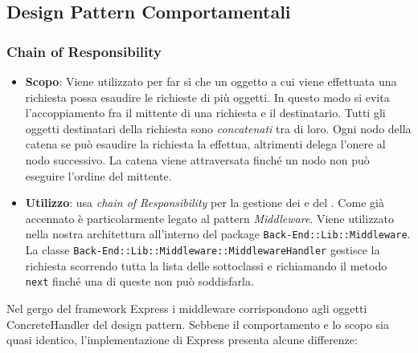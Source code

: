 \subsection{Design Pattern Comportamentali}

\subsubsection{Chain of Responsibility}
\label{chain-of-responsibility}

\begin{itemize}

	\item \textbf{Scopo}:
	Viene utilizzato per far sì che un oggetto a cui viene effettuata una richiesta possa esaudire le richieste di più oggetti. In questo modo si evita l'accoppiamento fra il mittente di una richiesta e il destinatario. Tutti gli oggetti destinatari della richiesta sono \textit{concatenati} tra di loro. Ogni nodo della catena se può esaudire la richiesta la effettua, altrimenti delega l'onere al nodo successivo. La catena viene attraversata finché un nodo non può eseguire l'ordine del mittente. 
	
	\item \textbf{Utilizzo}:
	 usa \textit{chain of Responsibility} per la gestione dei  e del . Come già accennato è particolarmente legato al pattern \textit{Middleware}. Viene utilizzato nella nostra architettura all'interno del package \texttt{Back-End::Lib::Middleware}. La classe \texttt{Back-End::Lib::Middleware::MiddlewareHandler} gestisce la richiesta scorrendo tutta la lista delle sottoclassi e richiamando il metodo \texttt{next} finché una di queste non può soddisfarla.

\end{itemize}

Nel gergo del framework Express i middleware corrispondono agli oggetti ConcreteHandler del design pattern. Sebbene il comportamento e lo scopo sia quasi identico, l'implementazione di Express presenta alcune differenze:

